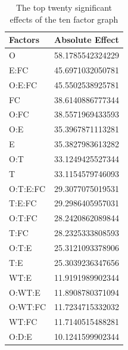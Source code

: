 \documentclass{llncs}
\begin{document}
\begin{table}
\vspace{-25pt}
    \begin{tabular}{ | l l |}
    \hline
    {\bf Factors} & {\bf Absolute Effect}  \\ \hline
      O & 58.1785542324229 \\ \hline
      E:FC & 45.6971032050781 \\ \hline
      O:E:FC & 45.5502538925781\\ \hline
      FC & 38.6140886777344\\ \hline
      O:FC & 38.5571969433593\\ \hline
      O:E & 35.3967871113281\\ \hline
      E & 35.3827983613282\\ \hline
      O:T & 33.1249425527344\\ \hline
      T & 33.1154579746093\\ \hline
      O:T:E:FC & 29.3077075019531\\ \hline
      T:E:FC & 29.2986405957031\\ \hline
      O:T:FC & 28.2420862089844\\ \hline
      T:FC & 28.2325333808593\\ \hline
      O:T:E & 25.3121093378906\\ \hline
      T:E & 25.3039236347656\\ \hline
      WT:E & 11.9191989902344\\ \hline
      O:WT:E & 11.8908780371094\\ \hline
      O:WT:FC & 11.7234715332032\\ \hline
      WT:FC & 11.7140515488281\\ \hline
      O:D:E & 10.1241599902344\\ \hline
    \end{tabular}
\caption{The top twenty significant effects of the ten factor graph}\label{10factorEffect}
      \vspace{-25pt}
\end{table}
\end{document}
